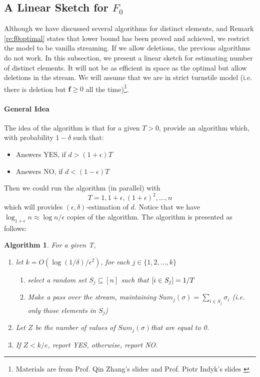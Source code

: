 \documentclass[11pt]{article}
\theoremstyle{plain}
\newtheorem{algorithm}{Algorithm}[section]
\let\Pr\relax
\DeclareMathOperator*{\Pr}{\mathbb{P}}
\begin{document}
\subsection{A Linear Sketch for $F_0$}
 
Although we have discussed several algorithms for distinct elements, and 
Remark  \ref{re:f0optimal} states that lower bound has been proved and 
achieved, we restrict the model to be vanilla streaming. If we allow deletions, 
the previous algorithms do not work. In this subsection, we present a linear 
sketch for estimating number of distinct elements. It will not be as efficient in 
space as the optimal but allow deletions in the stream. We will assume that 
we are in strict turnstile model (i.e. there is deletion but $\textbf{f}\geq 0$ all 
the time)\footnote{Materials are from Prof. Qin Zhang's 
slides  \cite{zhang2017-slides} and Prof. Piotr Indyk's 
slides  \cite{indyk07-web}}.

\paragraph{General Idea}
The idea of the algorithm is that for a given $T>0$, provide an algorithm
which, with probability $1-\delta$ such that:
\begin{itemize}
	\item Answers YES, if $d> (1+\epsilon)T$
	\item Answers NO, if $d< (1-\epsilon)T$
\end{itemize}
Then we could run the algorithm (in parallel) with
\[
T=1, 1+\epsilon, (1+\epsilon)^2, \dots, n
\]
which will provides $(\epsilon, \delta)$-estimation of $d$. Notice that we 
have $\log_{1+\epsilon}n\approx \log n/\epsilon$ copies of the algorithm. The 
algorithm is presented as follows:

\begin{algorithm}
For a given T, 
\begin{enumerate}
	\item let $k=O(\log(1/\delta)/\epsilon^2)$, for each $j\in 
	\{1,2,\dots,k\}$
	\begin{enumerate}
		\item select a random set $S_j \subseteq[n]$ such that $\Pr[i\in S_j]=1/T$
		\item Make a pass over the stream, maintaining 
		$Sum_{j}(\sigma)=\sum_{i\in S_j} \sigma_i$ (i.e. only those elements in 
		$S_j$)
	\end{enumerate}
\item Let $Z$ be the number of values of $Sum_{j} (\sigma) $that are equal to 
0. 
\item If $Z<k/e$, report YES, otherwise, report NO.
\end{enumerate}
\end{algorithm}
\end{document}
